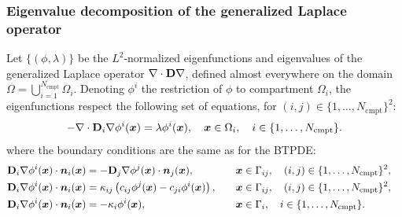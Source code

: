 \documentclass[a4paper]{article}
\begin{document}
\subsubsection{Eigenvalue decomposition of the generalized Laplace operator}

Let $\{(\phi, \lambda)\}$ be the $L^2$-normalized eigenfunctions and eigenvalues of the generalized Laplace operator $\nabla \cdot \mathbf{D} \nabla$, defined almost everywhere on the domain $\Omega = \bigcup_{i = 1}^{N_\text{cmpt}} \Omega_i$. Denoting $\phi^i$ the restriction of $\phi$ to compartment $\Omega_i$, the eigenfunctions respect the following set of equations, for $(i, j) \in \{1, \dots, N_\text{cmpt}\}^2$:
\begin{equation} \label{eq:laplace_eig}
    -\nabla \cdot \mathbf{D}_i \nabla \phi^i(\bm{x}) = \lambda \phi^i(\bm{x}), \quad \bm{x} \in \Omega_i, \quad i \in \{1, \dots, N_\text{cmpt}\}.
\end{equation}
where the boundary conditions are the same as for the BTPDE:
\begin{alignat}{3}
    \mathbf{D}_i \nabla \phi^i(\bm{x}) \cdot \bm{n}_i(\bm{x}) & = -\mathbf{D}_j \nabla \phi^j(\bm{x}) \cdot \bm{n}_j(\bm{x}), \quad                 &  & \bm{x} \in \Gamma_{i j}, \quad (i, j) \in \{1, \dots, N_\text{cmpt}\}^2, &                        \\
    \mathbf{D}_i \nabla \phi^i(\bm{x}) \cdot \bm{n}_i(\bm{x}) & = \kappa_{i j} \left(c_{i j} \phi^j(\bm{x}) - c_{j i}\phi^i(\bm{x})\right), \quad &  & \bm{x} \in \Gamma_{i j}, \quad (i, j) \in \{1, \dots, N_\text{cmpt}\}^2, &                        \\
    \mathbf{D}_i \nabla \phi^i(\bm{x}) \cdot \bm{n}_i(\bm{x}) & = -\kappa_i \phi^i(\bm{x}), \quad                                                  &  & \bm{x} \in \Gamma_i, \quad i \in \{1, \dots, N_\text{cmpt}\}.            & \label{eq:lap_neumann}
\end{alignat}
\end{document}
